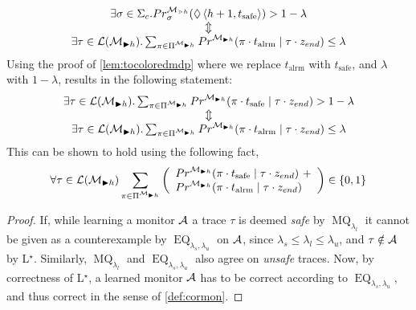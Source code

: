 \documentclass[runningheads]{llncs}
\newcommand{\talrm}{t_{\text{alrm}}}
\newcommand{\tsafe}{t_{\text{safe}}}
\newcommand{\en}{z_{\color{black} end}\xspace}
\newcommand{\safes}[1][h+1]{\left\langle #1, \tsafe\right\rangle}
\newcommand{\ccSched}{\Sigma_c}
\newcommand{\EQ}{\operatorname{EQ}}
\newcommand{\MQ}{\operatorname{MQ}}
\begin{document}
{\begin{proofoutline}
    \[
        \begin{array}{c}
            \exists \sigma \in \ccSched.  \Prob^{\mdp_{\gtrdot h}}_{\sigma}(\lozenge \safes) > 1 - \lambda \\
            \Updownarrow                                                                                   \\
            \exists \tau \in \lang{\mc_{\blacktriangleright h}}. \sum_{\pi\in\Pi^{\mc_{\blacktriangleright h}}}\Prob^{\mc_{\blacktriangleright h}}(\pi \cdot \talrm \mid \tau \cdot \en) \leq \lambda
        \end{array}
    \]
    Using the proof of \cref{lem:tocoloredmdp} where we replace $\talrm$ with $\tsafe$, and $\lambda$ with $1 - \lambda$, results in the following statement:
    \[
        \begin{array}{c}
            \exists \tau \in \lang{\mc_{\blacktriangleright h}}. \sum_{\pi\in\Pi^{\mc_{\blacktriangleright h}}}\Prob^{\mc_{\blacktriangleright h}}(\pi \cdot \tsafe \mid \tau \cdot \en) > 1 - \lambda \\
            \Updownarrow                                                                                                                                                                               \\
            \exists \tau \in \lang{\mc_{\blacktriangleright h}}. \sum_{\pi\in\Pi^{\mc_{\blacktriangleright h}}}\Prob^{\mc_{\blacktriangleright h}}(\pi \cdot \talrm \mid \tau \cdot \en) \leq \lambda
        \end{array}
    \]
    This can be shown to hold using the following fact,
    \begin{align*}
        \forall\tau \in \lang{\mc_{\blacktriangleright h}} \sum_{\pi\in\Pi^{\mc_{\blacktriangleright h}}}
        \left(
        \begin{array}{l}
                \Prob^{\mc_{\blacktriangleright h}}(\pi \cdot \tsafe \mid \tau \cdot \en)\ + \\
                \Prob^{\mc_{\blacktriangleright h}}(\pi \cdot \talrm \mid \tau \cdot \en)
            \end{array}
        \right)
        \in \{0,1\}
    \end{align*}
\end{proofoutline}

\learncor*
\begin{proof}
    If, while learning a monitor $\mathcal{A}$ a trace $\tau$ is deemed \emph{safe} by $\MQ_{\lambda_l}$ it cannot be given as a counterexample by $\EQ_{\lambda_s, \lambda_u}$ on $\mathcal{A}$, since $\lambda_s \leq \lambda_l \leq \lambda_u$, and $\tau\notin\mathcal{A}$ by L$^\star$. Similarly, $\MQ_{\lambda_l}$ and $\EQ_{\lambda_s, \lambda_u}$ also agree on \emph{unsafe} traces. Now, by correctness of L$^\star$, a learned monitor $\mathcal{A}$ has to be correct according to $\EQ_{\lambda_s, \lambda_u}$, and thus correct in the sense of \cref{def:cormon}.
\end{proof}

}
\end{document}

